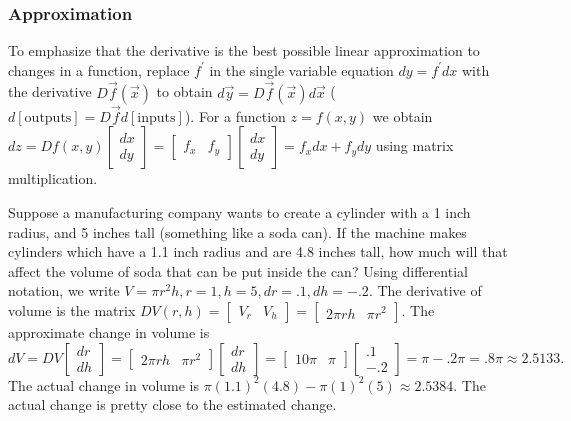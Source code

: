 \documentclass[10pt]{article}
\begin{document}
\subsubsection{Approximation}
To emphasize that the derivative is the best possible linear approximation to changes in a function, replace $f^\prime$ in the single variable equation $dy=f^\prime dx$ with the derivative $D\vec f(\vec x)$ to obtain $d\vec y =D\vec f(\vec x)d\vec x$ ($d[\text{outputs}]=D\vec f d[\text{inputs}]$).  For a function $z=f(x,y)$ we obtain $dz=Df(x,y)\begin{bmatrix}dx\\dy\end{bmatrix} = \begin{bmatrix}f_x&f_y\end{bmatrix}\begin{bmatrix}dx\\dy\end{bmatrix} = f_xdx+f_ydy$ using matrix multiplication. 

Suppose a manufacturing company wants to create a cylinder with a 1 inch radius, and 5 inches tall (something like a soda can). If the machine makes cylinders which have a 1.1 inch radius and are 4.8 inches tall, how much will that affect the volume of soda that can be put inside the can? Using differential notation, we write $V=\pi r^2 h,r=1,h=5,dr=.1,dh=-.2$. The derivative of volume is the matrix $DV(r,h) = \begin{bmatrix}V_r& V_h\end{bmatrix} =   \begin{bmatrix}2\pi r h& \pi r^2\end{bmatrix}$.  The approximate change in volume is 
$$dV 
= DV \begin{bmatrix}dr\\dh\end{bmatrix} 
= \begin{bmatrix}2\pi r h& \pi r^2\end{bmatrix}\begin{bmatrix}dr\\dh\end{bmatrix}
= \begin{bmatrix}10\pi& \pi\end{bmatrix}\begin{bmatrix}.1\\-.2\end{bmatrix}
= \pi-.2\pi = .8\pi \approx2.5133.
$$
The actual change in volume is $\pi (1.1)^2(4.8) - \pi(1)^2(5) \approx 2.5384$. The actual change is pretty close to the estimated change.  
\end{document}
